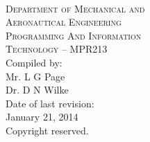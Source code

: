 \begin{titlepage}
    \thispagestyle{empty}
    \begin{center}
        \ \\
        \vspace{1.5cm}
        {\Large
            \textsc{Department of Mechanical and} \\
            \vspace{0.2cm}
            \textsc{Aeronautical Engineering}} \\
        \vspace{1.2cm}
        {\huge
            \textsc{Programming And Information} \\
            \vspace{0.4em}
            \textsc{Technology -- MPR213}} \\
        \vspace{2.0cm}
        {\large Compiled by:} \\
        \vspace{0.2cm}
        {\large Mr. L G Page} \\
        {\large Dr. D N Wilke} \\
        \vspace{1cm}
        {\large Date of last revision:} \\
        \vspace{0.2cm}
        {\large January 21, 2014} \\
        \vspace{1cm}
        {\large Copyright reserved.} \\
    \end{center}
\end{titlepage}
